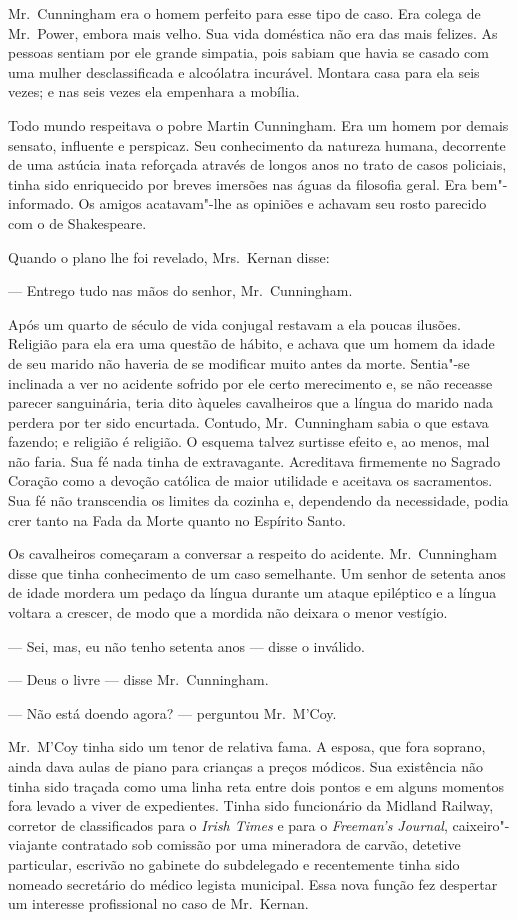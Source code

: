 Mr.~Cunningham era o homem perfeito para esse tipo de caso.  Era colega de 
Mr.~Power, embora mais velho.  Sua vida doméstica não era das mais felizes.  As
pessoas sentiam por ele grande simpatia, pois sabiam que havia se casado com
uma mulher desclassificada e alcoólatra incurável.  Montara casa para ela seis
vezes; e nas seis vezes ela empenhara a mobília.

Todo mundo respeitava o pobre Martin Cunningham.  Era um homem por demais
sensato, influente e perspicaz.  Seu conhecimento da natureza humana,
decorrente de uma astúcia inata reforçada através de longos anos no trato de
casos policiais, tinha sido enriquecido por breves imersões nas águas da
filosofia geral.  Era bem"-informado.  Os amigos acatavam"-lhe as opiniões e
achavam seu rosto parecido com o de Shakespeare.

Quando o plano lhe foi revelado, Mrs.~Kernan disse:

--- Entrego tudo nas mãos do senhor, Mr.~Cunningham.

Após um quarto de século de vida conjugal restavam a ela poucas ilusões.
Religião para ela era uma questão de hábito, e achava que um homem da idade de
seu marido não haveria de se modificar muito antes da morte.  Sentia"-se
inclinada a ver no acidente sofrido por ele certo merecimento e, se não
receasse parecer sanguinária, teria dito àqueles cavalheiros que a língua do
marido nada perdera por ter sido encurtada.  Contudo, Mr.~Cunningham sabia o
que estava fazendo; e religião é religião.  O esquema talvez surtisse efeito e,
ao menos, mal não faria.  Sua fé nada tinha de extravagante.  Acreditava
firmemente no Sagrado Coração como a devoção católica de maior utilidade e
aceitava os sacramentos.  Sua fé não transcendia os limites da cozinha e,
dependendo da necessidade, podia crer tanto na Fada da Morte quanto no Espírito
Santo.

Os cavalheiros começaram a conversar a respeito do acidente.  Mr.~Cunningham
disse que tinha conhecimento de um caso semelhante.  Um senhor de setenta anos
de idade mordera um pedaço da língua durante um ataque epiléptico e a língua
voltara a crescer, de modo que a mordida não deixara o menor vestígio.

--- Sei, mas, eu não tenho setenta anos --- disse o inválido.

--- Deus o livre --- disse Mr.~Cunningham.

--- Não está doendo agora? --- perguntou Mr.~M’Coy.

Mr.~M’Coy tinha sido um tenor de relativa fama.  A esposa, que fora soprano,
ainda dava aulas de piano para crianças a preços módicos.  Sua existência não
tinha sido traçada como uma linha reta entre dois pontos e em alguns momentos
fora levado a viver de expedientes.  Tinha sido funcionário da Midland Railway,
corretor de classificados para o \textit{Irish Times} e para o
\textit{Freeman’s Journal}, caixeiro"-viajante contratado sob comissão por uma
mineradora de carvão, detetive particular, escrivão no gabinete do subdelegado
e recentemente tinha sido nomeado secretário do médico legista municipal.  Essa
nova função fez despertar um interesse profissional no caso de Mr.~Kernan.

